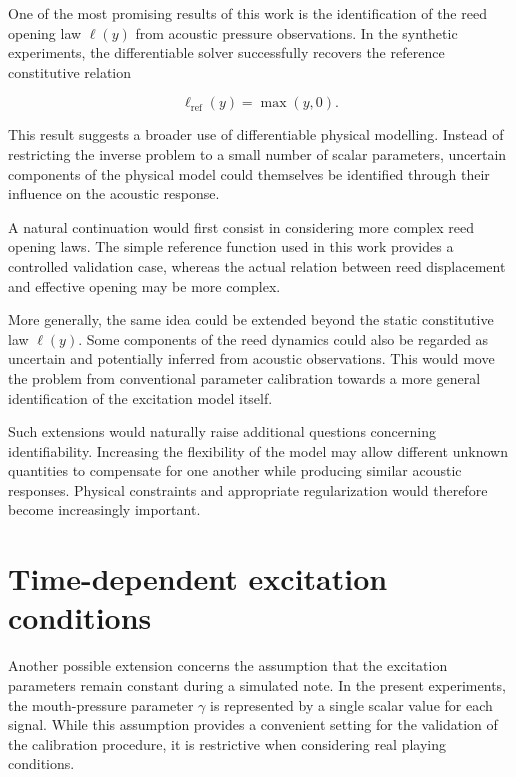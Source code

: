 \documentclass[11pt,a4paper]{report}
\theoremstyle{plain}
\theoremstyle{definition}
\begin{document}
One of the most promising results of this work is the identification of the
reed opening law $\ell(y)$ from acoustic pressure observations. In the
synthetic experiments, the differentiable solver successfully recovers the
reference constitutive relation

\begin{equation}
    \ell_{\mathrm{ref}}(y)=\max(y,0).
\end{equation}

This result suggests a broader use of differentiable physical modelling.
Instead of restricting the inverse problem to a small number of scalar
parameters, uncertain components of the physical model could themselves be
identified through their influence on the acoustic response.

A natural continuation would first consist in considering more complex reed
opening laws. The simple reference function used in this work provides a
controlled validation case, whereas the actual relation between reed
displacement and effective opening may be more complex.

More generally, the same idea could be extended beyond the static constitutive
law $\ell(y)$. Some components of the reed dynamics could also be regarded as
uncertain and potentially inferred from acoustic observations. This would move
the problem from conventional parameter calibration towards a more general
identification of the excitation model itself.

Such extensions would naturally raise additional questions concerning
identifiability. Increasing the flexibility of the model may allow different
unknown quantities to compensate for one another while producing similar
acoustic responses. Physical constraints and appropriate regularization would
therefore become increasingly important.

\section{Time-dependent excitation conditions}

Another possible extension concerns the assumption that the excitation
parameters remain constant during a simulated note. In the present experiments,
the mouth-pressure parameter $\gamma$ is represented by a single scalar value
for each signal. While this assumption provides a convenient setting for the
validation of the calibration procedure, it is restrictive when considering
real playing conditions.
\end{document}
